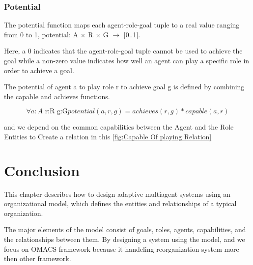 \subsubsection{Potential}
The potential function maps each agent-role-goal tuple to a real value ranging from 0 to 1, 
potential: A $\times$ R $\times$ G $\rightarrow$ [0..1]\cite{omacs4}.

Here, a 0 indicates that the agent-role-goal tuple cannot be
used to achieve the goal while a non-zero value indicates how well an agent can play
a specific role in order to achieve a goal.  

The potential of agent a to play role r 
to achieve goal g is defined by combining the capable and achieves functions\cite{omacs4}.

\begin{equation}
\forall a:A\textrm{ r:R g:G}potential(a,r,g)=achieves(r,g)*capable(a,r)\label{eq:potentialFunc}
\end{equation}

and we depend on the common capabilities between the Agent and the Role Entities to Create a relation in this \ref{fig:Capable Of playing Relation} 


  


\section{Conclusion}
This chapter describes how to design adaptive multiagent
systems using an organizational model, which defines the
entities and relationships of a typical organization.

The major elements of the model consist of goals, roles, agents,
capabilities, and the relationships between them. By
designing a system using the model, and we focus on OMACS framework
because it handeling reorganization system more then other framework.


